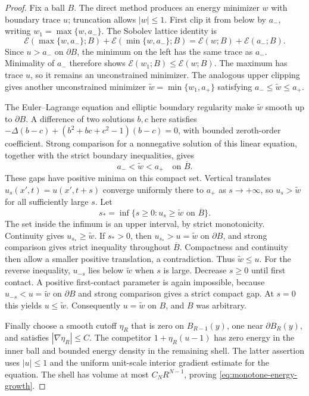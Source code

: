 \begin{proof}
Fix a ball $B$.  The direct method produces an energy minimizer $w$ with
boundary trace $u$; truncation allows $|w|\le1$.  First clip it from
below by $a_-$, writing $w_1=\max\{w,a_-\}$.  The Sobolev lattice
identity is
\[
 \mathcal E(\max\{w,a_-\};B)
 +\mathcal E(\min\{w,a_-\};B)
 =\mathcal E(w;B)+\mathcal E(a_-;B).
\]
Since $u>a_-$ on $\partial B$, the minimum on the left has the same
trace as $a_-$.  Minimality of $a_-$ therefore shows
$\mathcal E(w_1;B)\le\mathcal E(w;B)$.  The maximum has trace $u$,
so it remains an unconstrained minimizer.  The analogous upper clipping
gives another unconstrained minimizer
$\widetilde w=\min\{w_1,a_+\}$ satisfying
$a_-\le\widetilde w\le a_+$.

The Euler--Lagrange equation and elliptic boundary regularity make
$\widetilde w$ smooth up to $\partial B$.  A difference of two
solutions $b,c$ here satisfies
$-\Delta(b-c)+(b^2+bc+c^2-1)(b-c)=0$, with bounded zeroth-order
coefficient.  Strong comparison for a nonnegative solution of this
linear equation, together with the strict boundary inequalities, gives
\[
 a_-<\widetilde w<a_+\quad\text{on }\overline B.
\]
These gaps have positive minima on this compact set.  Vertical translates
$u_s(x',t)=u(x',t+s)$ converge uniformly there to $a_+$ as
$s\to+\infty$, so $u_s>\widetilde w$ for all sufficiently large $s$.
Let
\[
 s_* =\inf\{s\ge0:u_s\ge\widetilde w\text{ on }\overline B\}.
\]
The set inside the infimum is an upper interval, by strict monotonicity.
Continuity gives $u_{s_*}\ge\widetilde w$.  If $s_*>0$, then
$u_{s_*}>u=\widetilde w$ on $\partial B$, and strong comparison gives
strict inequality throughout $\overline B$.  Compactness and continuity
then allow a smaller positive translation, a contradiction.  Thus
$\widetilde w\le u$.  For the reverse inequality, $u_{-s}$ lies below
$\widetilde w$ when $s$ is large.  Decrease $s\ge0$ until first
contact.  A positive first-contact parameter is again impossible, because
$u_{-s}<u=\widetilde w$ on $\partial B$ and strong comparison gives
a strict compact gap.  At $s=0$ this yields $u\le\widetilde w$.
Consequently $u=\widetilde w$ on $B$, and $B$ was arbitrary.

Finally choose a smooth cutoff $\eta_R$ that is zero on $B_{R-1}(y)$,
one near $\partial B_R(y)$, and satisfies $|\nabla\eta_R|\le C$.
The competitor $1+\eta_R(u-1)$ has zero energy in the inner ball and
bounded energy density in the remaining shell.  The latter assertion
uses $|u|\le1$ and the uniform unit-scale interior gradient estimate for
the equation.  The shell has volume at most $C_NR^{N-1}$, proving
\eqref{eq:monotone-energy-growth}.
\end{proof}

